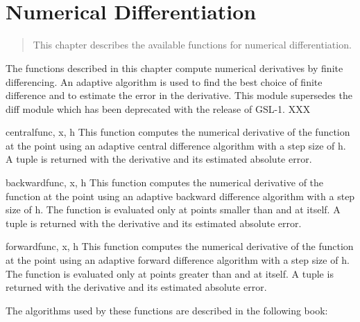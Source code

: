 \chapter[\protect\module{pygsl.deriv} --- NumericalDifferentiation]%
{\protect{} \\ Numerical Differentiation}
\label{cha:diff-module}

%

\begin{quote}
  This chapter describes the available functions for numerical differentiation.
\end{quote}

The functions described in this chapter compute numerical derivatives by finite
differencing.  An adaptive algorithm is used to find the best choice of finite
difference and to estimate the error in the derivative. This module supersedes
the diff module which has been deprecated with the release of GSL-1. XXX


\begin{funcdesc}{central}{func, x, h}
  This function computes the numerical derivative of the function  at
  the point  using an adaptive central difference algorithm with a step
  size of h.  A tuple  is returned with the derivative
  and its estimated absolute error.
\end{funcdesc}

\begin{funcdesc}{backward}{func, x, h}
  This function computes the numerical derivative of the function  at
  the point  using an adaptive backward difference algorithm with a step
  size of h.  The function  is evaluated only at points smaller than
   and at  itself.  A tuple  is returned
  with the derivative and its estimated absolute error.
\end{funcdesc}

\begin{funcdesc}{forward}{func, x, h}
  This function computes the numerical derivative of the function  at
  the point  using an adaptive forward difference algorithm with a step
  size of h.  The function  is evaluated only at points greater than
   and at  itself.  A tuple  is returned
  with the derivative and its estimated absolute error.
\end{funcdesc}


\begin{seealso}
  The algorithms used by these functions are described in the following book:
\end{seealso}



